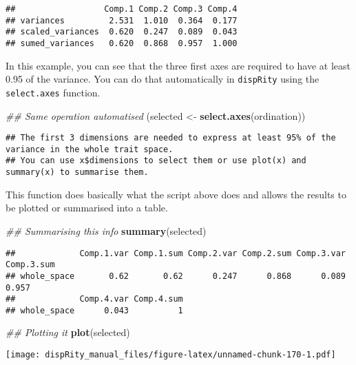 \documentclass[
]{book}
\newenvironment{Shaded}{\begin{snugshade}}{\end{snugshade}}
\newcommand{\CommentTok}[1]{\textcolor[rgb]{0.56,0.35,0.01}{\textit{#1}}}
\newcommand{\KeywordTok}[1]{\textcolor[rgb]{0.13,0.29,0.53}{\textbf{#1}}}
\newcommand{\NormalTok}[1]{#1}
\newcommand{\StringTok}[1]{\textcolor[rgb]{0.31,0.60,0.02}{#1}}
\begin{document}
\begin{verbatim}
##                  Comp.1 Comp.2 Comp.3 Comp.4
## variances         2.531  1.010  0.364  0.177
## scaled_variances  0.620  0.247  0.089  0.043
## sumed_variances   0.620  0.868  0.957  1.000
\end{verbatim}

In this example, you can see that the three first axes are required to have at least 0.95 of the variance.
You can do that automatically in \texttt{dispRity} using the \texttt{select.axes} function.

\begin{Shaded}
\begin{Highlighting}[]
\CommentTok{\#\# Same operation automatised}
\NormalTok{(selected \textless{}{-}}\StringTok{ }\KeywordTok{select.axes}\NormalTok{(ordination))}
\end{Highlighting}
\end{Shaded}

\begin{verbatim}
## The first 3 dimensions are needed to express at least 95% of the variance in the whole trait space.
## You can use x$dimensions to select them or use plot(x) and summary(x) to summarise them.
\end{verbatim}

This function does basically what the script above does and allows the results to be plotted or summarised into a table.

\begin{Shaded}
\begin{Highlighting}[]
\CommentTok{\#\# Summarising this info}
\KeywordTok{summary}\NormalTok{(selected)}
\end{Highlighting}
\end{Shaded}

\begin{verbatim}
##             Comp.1.var Comp.1.sum Comp.2.var Comp.2.sum Comp.3.var Comp.3.sum
## whole_space       0.62       0.62      0.247      0.868      0.089      0.957
##             Comp.4.var Comp.4.sum
## whole_space      0.043          1
\end{verbatim}

\begin{Shaded}
\begin{Highlighting}[]
\CommentTok{\#\# Plotting it}
\KeywordTok{plot}\NormalTok{(selected)}
\end{Highlighting}
\end{Shaded}

\texttt{[image: dispRity\_manual\_files/figure-latex/unnamed-chunk-170-1.pdf]}
\end{document}
